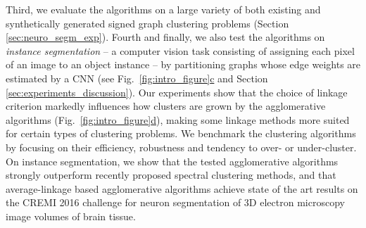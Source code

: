 Third, we evaluate the algorithms on a large variety of both existing and synthetically generated signed graph clustering problems (Section \ref{sec:neuro_segm_exp}). 
Fourth and finally, we also test the algorithms on \emph{instance segmentation} -- a computer vision task consisting of assigning each pixel of an image to an object instance -- by partitioning graphs whose edge weights are estimated by a CNN (see Fig.~\hyperref[fig:intro_figure]{\ref*{fig:intro_figure}c} and Section \ref{sec:experiments_discussion}).
Our experiments show that the choice of linkage criterion markedly influences how clusters are grown by the agglomerative algorithms (Fig.~\hyperref[fig:intro_figure]{\ref*{fig:intro_figure}d}), making some linkage methods more suited for certain types of clustering problems.
We benchmark the clustering algorithms by focusing on their efficiency, robustness and tendency to over- or under-cluster. 
On instance segmentation, we show that the tested agglomerative algorithms strongly outperform recently proposed spectral clustering methods, and that average-linkage based agglomerative algorithms achieve state of the art results on the CREMI 2016 challenge for neuron segmentation of 3D electron microscopy image volumes of brain tissue. 









